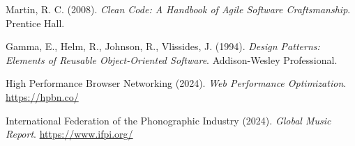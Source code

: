 \documentclass{book}
\begin{document}
\begin{thebibliography}{99}
 Martin, R. C. (2008). \textit{Clean Code: A Handbook of Agile Software Craftsmanship}.
Prentice Hall.

 Gamma, E., Helm, R., Johnson, R., Vlissides, J. (1994). \textit{Design Patterns: Elements of Reusable Object-Oriented Software}.
Addison-Wesley Professional.

 High Performance Browser Networking (2024). \textit{Web Performance Optimization}.
\url{https://hpbn.co/}

 International Federation of the Phonographic Industry (2024). \textit{Global Music Report}.
\url{https://www.ifpi.org/}

\end{thebibliography}
\end{document}
